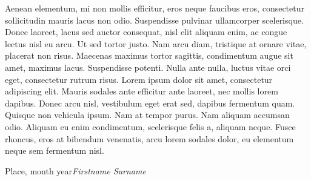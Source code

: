 %
%

\foreword

Aenean elementum, mi non mollis efficitur, eros neque faucibus eros, consectetur sollicitudin mauris lacus non odio. Suspendisse pulvinar ullamcorper scelerisque. Donec laoreet, lacus sed auctor consequat, nisl elit aliquam enim, ac congue lectus nisl eu arcu. Ut sed tortor justo. Nam arcu diam, tristique at ornare vitae, placerat non risus. Maecenas maximus tortor sagittis, condimentum augue sit amet, maximus lacus. Suspendisse potenti. Nulla ante nulla, luctus vitae orci eget, consectetur rutrum risus. Lorem ipsum dolor sit amet, consectetur adipiscing elit. Mauris sodales ante efficitur ante laoreet, nec mollis lorem dapibus. Donec arcu nisl, vestibulum eget erat sed, dapibus fermentum quam. Quisque non vehicula ipsum. Nam at tempor purus. Nam aliquam accumsan odio. Aliquam eu enim condimentum, scelerisque felis a, aliquam neque. Fusce rhoncus, eros at bibendum venenatis, arcu lorem sodales dolor, eu elementum neque sem fermentum nisl.


\vspace{\baselineskip}
\begin{flushright}\noindent
Place, month year\hfill {\it Firstname  Surname}\\
\end{flushright}


